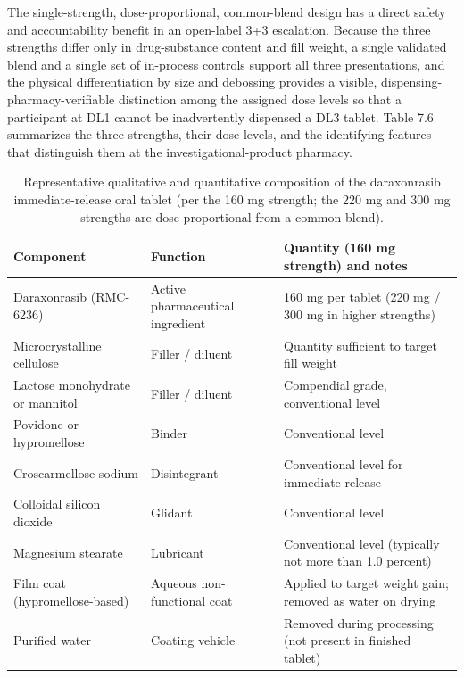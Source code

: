 The single-strength, dose-proportional, common-blend design has a direct safety
and accountability benefit in an open-label 3+3 escalation. Because the three
strengths differ only in drug-substance content and fill weight, a single
validated blend and a single set of in-process controls support all three
presentations, and the physical differentiation by size and debossing provides a
visible, dispensing-pharmacy-verifiable distinction among the assigned dose
levels so that a participant at DL1 cannot be inadvertently dispensed a DL3
tablet. Table 7.6 summarizes the three strengths, their dose levels, and the
identifying features that distinguish them at the investigational-product
pharmacy.

\begin{table}[t]
\centering
\caption{Representative qualitative and quantitative composition of the
daraxonrasib immediate-release oral tablet (per the 160 mg strength; the 220 mg
and 300 mg strengths are dose-proportional from a common blend).}
\label{tab:cmc-dp-comp}
\begin{tabularx}{\textwidth}{L{4.4cm} L{4.6cm} Y}
\toprule
\textbf{Component} & \textbf{Function} & \textbf{Quantity (160 mg strength) and notes} \\
\midrule
Daraxonrasib (RMC-6236) & Active pharmaceutical ingredient & 160 mg per tablet (220 mg / 300 mg in higher strengths) \\
Microcrystalline cellulose & Filler / diluent & Quantity sufficient to target fill weight \\
Lactose monohydrate or mannitol & Filler / diluent & Compendial grade, conventional level \\
Povidone or hypromellose & Binder & Conventional level \\
Croscarmellose sodium & Disintegrant & Conventional level for immediate release \\
Colloidal silicon dioxide & Glidant & Conventional level \\
Magnesium stearate & Lubricant & Conventional level (typically not more than 1.0 percent) \\
Film coat (hypromellose-based) & Aqueous non-functional coat & Applied to target weight gain; removed as water on drying \\
Purified water & Coating vehicle & Removed during processing (not present in finished tablet) \\
\bottomrule
\end{tabularx}
\end{table}

